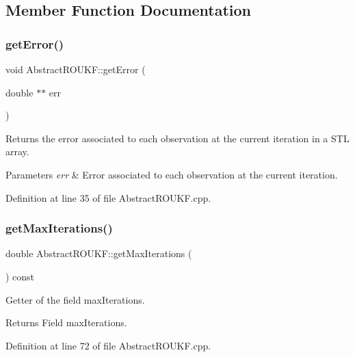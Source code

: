 \subsection{Member Function Documentation}
\mbox{\label{classAbstractROUKF_aff309e6f34502fe604b1130a4185cb56}} 
\subsubsection{\texorpdfstring{get\+Error()}{getError()}}
{\footnotesize\ttfamily void Abstract\+R\+O\+U\+K\+F\+::get\+Error (\begin{DoxyParamCaption}\item[{double $\ast$$\ast$}]{err }\end{DoxyParamCaption})}

Returns the error associated to each observation at the current iteration in a S\+TL array. 
\begin{DoxyParams}{Parameters}
{\em err} & Error associated to each observation at the current iteration. \\
\hline
\end{DoxyParams}


Definition at line 35 of file Abstract\+R\+O\+U\+K\+F.\+cpp.

\mbox{\label{classAbstractROUKF_ac1d872b69fb061600b259d13b2add657}} 
\subsubsection{\texorpdfstring{get\+Max\+Iterations()}{getMaxIterations()}}
{\footnotesize\ttfamily double Abstract\+R\+O\+U\+K\+F\+::get\+Max\+Iterations (\begin{DoxyParamCaption}{ }\end{DoxyParamCaption}) const}

Getter of the field {\ttfamily max\+Iterations}. \begin{DoxyReturn}{Returns}
Field {\ttfamily max\+Iterations}. 
\end{DoxyReturn}


Definition at line 72 of file Abstract\+R\+O\+U\+K\+F.\+cpp.

